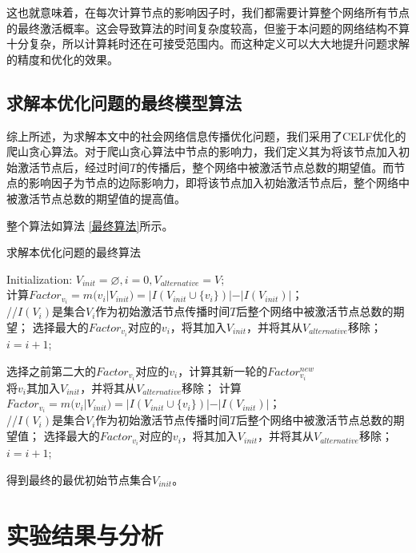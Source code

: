 \documentclass[UTF8]{ctexart}
\begin{document}
这也就意味着，在每次计算节点的影响因子时，我们都需要计算整个网络所有节点的最终激活概率。这会导致算法的时间复杂度较高，但鉴于本问题的网络结构不算十分复杂，所以计算耗时还在可接受范围内。而这种定义可以大大地提升问题求解的精度和优化的效果。

\subsection{求解本优化问题的最终模型算法}
综上所述，为求解本文中的社会网络信息传播优化问题，我们采用了CELF优化的爬山贪心算法。对于爬山贪心算法中节点的影响力，我们定义其为将该节点加入初始激活节点后，经过时间$T$的传播后，整个网络中被激活节点总数的期望值。而节点的影响因子为节点的边际影响力，即将该节点加入初始激活节点后，整个网络中被激活节点总数的期望值的提高值。

整个算法如算法 \ref{最终算法}所示。

\begin{algorithm}[h!]
	\caption{求解本优化问题的最终算法}
	\label{最终算法}	
	Initialization: $V_{init}=\varnothing , i=0, V_{alternative}=V $;\\
	{
		计算$Factor_{v_i}=m(v_i|V_{init})=|I(V_{init}\cup \{v_i\})|-|I(V_{init})|$；\\
		//$I(V_{i})$是集合$V_{i}$作为初始激活节点传播时间$T$后整个网络中被激活节点总数的期望；
	}
	选择最大的$Factor_{v_i}$对应的$v_i$，将其加入$V_{init}$，并将其从$V_{alternative}$移除；\\
	$i=i+1$; \\
	{
		选择之前第二大的$Factor_{v_i}$对应的$v_i$，计算其新一轮的$Factor_{v_i}^{new}$ \\
		{
			将$v_i$其加入$V_{init}$，并将其从$V_{alternative}$移除；
		}
		\Else
		{
			{
				计算$Factor_{v_i}=m(v_i|V_{init})=|I(V_{init}\cup \{v_i\})|-|I(V_{init})|$；\\
				//$I(V_{i})$是集合$V_{i}$作为初始激活节点传播时间$T$后整个网络中被激活节点总数的期望值；
			}
			选择最大的$Factor_{v_i}$对应的$v_i$，将其加入$V_{init}$，并将其从$V_{alternative}$移除；
		}
		$i=i+1$;
	
	}
	得到最终的最优初始节点集合$V_{init}$。
\end{algorithm}



\section{实验结果与分析}
\end{document}
